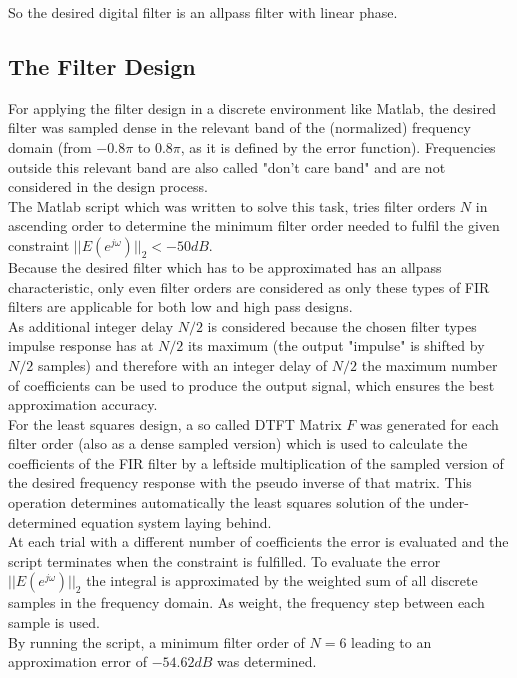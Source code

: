 So the desired digital filter is an allpass filter with linear phase.


\subsection{The Filter Design}
\label{chap:filter_design}
For applying the filter design in a discrete environment like Matlab, the desired filter was sampled dense in the relevant band of the (normalized) frequency domain (from $-0.8\pi$ to $0.8\pi$, as it is defined by the error function). Frequencies outside this relevant band are also called "don't care band" and are not considered in the design process.\\
The Matlab script which was written to solve this task, tries filter orders $N$ in ascending order to determine the minimum filter order needed to fulfil the given constraint $||E(e^{j\omega})||_2 < -50dB$.\\
Because the desired filter which has to be approximated has an allpass characteristic, only even filter orders are considered as only these types of FIR filters are applicable for both low and high pass designs.\\
As additional integer delay $N/2$ is considered because the chosen filter types impulse response has at $N/2$ its maximum (the output "impulse" is shifted by $N/2$ samples) and therefore with an integer delay of $N/2$ the maximum number of coefficients can be used to produce the output signal, which ensures the best approximation accuracy.\\
For the least squares design, a so called DTFT Matrix $F$ was generated for each filter order (also as a dense sampled version) which is used to calculate the coefficients of the FIR filter by a leftside multiplication of the sampled version of the desired frequency response with the pseudo inverse of that matrix. This operation determines automatically the least squares solution of the under-determined equation system laying behind.\\
At each trial with a different number of coefficients the error is evaluated and the script terminates when the constraint is fulfilled. To evaluate the error $||E(e^{j\omega})||_2$ the integral is approximated by the weighted sum of all discrete samples in the frequency domain. As weight, the frequency step between each sample is used.\\
By running the script, a minimum filter order of $N=6$ leading to an approximation error of $-54.62dB$ was determined.

